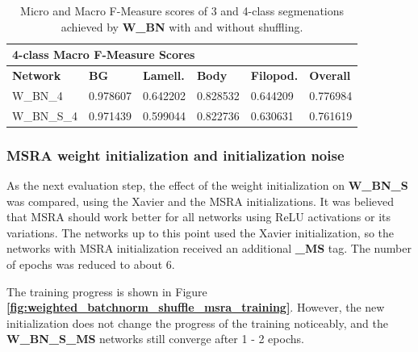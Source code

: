 \begin {table}
\begin{flushleft}
\begin {tabular}[!htb]{|l|l|l|l|l|l|}
			\multicolumn{6}{|l|}{\textbf{4-class Macro F-Measure Scores}} \\ \hline
			\textbf{Network}& \textbf{BG}& \textbf{Lamell.}& \textbf{Body}& \textbf{Filopod.}& \textbf{Overall} \\ \hline
			W\_BN\_4& \cellcolor{green!25}0.978607& \cellcolor{green!25}0.642202& \cellcolor{green!25}0.828532& \cellcolor{green!25}0.644209& \cellcolor{green!25}0.776984 \\ \hline
			W\_BN\_S\_4& 0.971439& 0.599044& 0.822736& 0.630631& 0.761619 \\ \hline
		\end {tabular}
	\end {flushleft}

\caption[Micro and Macro F-Measure scores for a network with Batch Normalization and with or without shuffling.]{Micro and Macro F-Measure scores of 3 and 4-class segmenations achieved by \textbf{W\_BN} with and without shuffling.}
\label{tab:results3}
\end {table}


	\subsubsection {MSRA weight initialization and initialization noise}

	\label{subsec:msra_weight_jitter}

\noindent As the next evaluation step, the effect of the weight initialization on \textbf{W\_BN\_S} was compared, using the Xavier and the MSRA initializations. It was believed that MSRA should work better for all networks using ReLU activations or its variations. The networks up to this point used the Xavier initialization, so the networks with MSRA initialization received an additional \textbf{\_MS} tag. The number of epochs was reduced to about 6.

The training progress is shown in Figure \textbf{\ref{fig:weighted_batchnorm_shuffle_msra_training}}. However, the new initialization does not change the progress of the training noticeably, and the \textbf{W\_BN\_S\_MS} networks still converge after 1 - 2 epochs.\\


